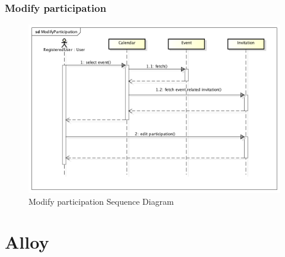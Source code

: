 \subsubsection{Modify participation}
\begin{center}
 \begin{figure}[H]
    \includegraphics[width=1\textwidth]{../UMLDiagram/sequence/ModifyParticipation/ModifyParticipation.png}
    \caption{Modify participation Sequence Diagram}
     \label{fig:modpartseqdiag}
     \end{figure}
   \end{center}  
\section{Alloy}







